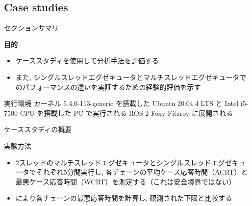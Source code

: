 \subsection{Case studies}
\label{ssec: case studies}

\begin{frame}{セクションサマリ}
    \begin{itembox}[l]{\textbf{目的}}
        \begin{itemize}
            \item ケーススタディを使用して分析手法を評価する
            \item また, シングルスレッドエグゼキュータとマルチスレッドエグゼキュータでのパフォーマンスの違いを実証するための経験的評価を示す
        \end{itemize}
    \end{itembox}
\end{frame}

\begin{frame}{実行環境}
    カーネル 5.4.0-113-generic を搭載した Ubuntu 20.04.4 LTS と Intel i5-7500 CPU を搭載した PC で実行される ROS 2 Foxy Fitzroy に展開される
\end{frame}


\begin{frame}{ケーススタディの概要}
\end{frame}

\begin{frame}{実験方法}
    \begin{itemize}
        \item 2スレッドのマルチスレッドエグゼキュータとシングルスレッドエグゼキュータでそれぞれ5分間実行し, 各チェーンの平均ケース応答時間（ACRT）と最悪ケース応答時間（WCRT）を測定する（これは安全境界ではない）
        \item {} により各チェーンの最悪応答時間を計算し, 観測された下限と比較する
    \end{itemize}
\end{frame}


